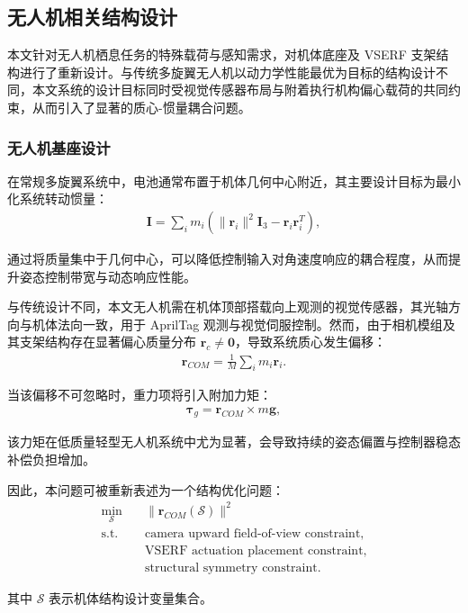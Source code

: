 \subsection{无人机相关结构设计}
本文针对无人机栖息任务的特殊载荷与感知需求，对机体底座及 VSERF 支架结构进行了重新设计。与传统多旋翼无人机以动力学性能最优为目标的结构设计不同，本文系统的设计目标同时受视觉传感器布局与附着执行机构偏心载荷的共同约束，从而引入了显著的质心-惯量耦合问题。

\subsubsection{无人机基座设计}
在常规多旋翼系统中，电池通常布置于机体几何中心附近，其主要设计目标为最小化系统转动惯量：
\begin{align}
\mathbf{I} = \sum_i m_i \left( \|\mathbf{r}_i\|^2 \mathbf{I}_3 - \mathbf{r}_i \mathbf{r}_i^T \right),
\end{align}

通过将质量集中于几何中心，可以降低控制输入对角速度响应的耦合程度，从而提升姿态控制带宽与动态响应性能。~\cite{tan2025center}

与传统设计不同，本文无人机需在机体顶部搭载向上观测的视觉传感器，其光轴方向与机体法向一致，用于 AprilTag 观测与视觉伺服控制。然而，由于相机模组及其支架结构存在显著偏心质量分布 $\mathbf{r}_c \neq \mathbf{0}$，导致系统质心发生偏移：
\begin{align}
\mathbf{r}_{COM} = \frac{1}{M} \sum_i m_i \mathbf{r}_i.
\end{align}

当该偏移不可忽略时，重力项将引入附加力矩：
\begin{align}
\boldsymbol{\tau}_g = \mathbf{r}_{COM} \times m \mathbf{g},
\end{align}

该力矩在低质量轻型无人机系统中尤为显著，会导致持续的姿态偏置与控制器稳态补偿负担增加。

因此，本问题可被重新表述为一个结构优化问题：
\begin{align}
\min_{\mathcal{S}} \quad & \|\mathbf{r}_{COM}(\mathcal{S})\|^2 \\
\text{s.t.} \quad & \text{camera upward field-of-view constraint}, \\
& \text{VSERF actuation placement constraint}, \\
& \text{structural symmetry constraint}.
\end{align}

其中 $\mathcal{S}$ 表示机体结构设计变量集合。

